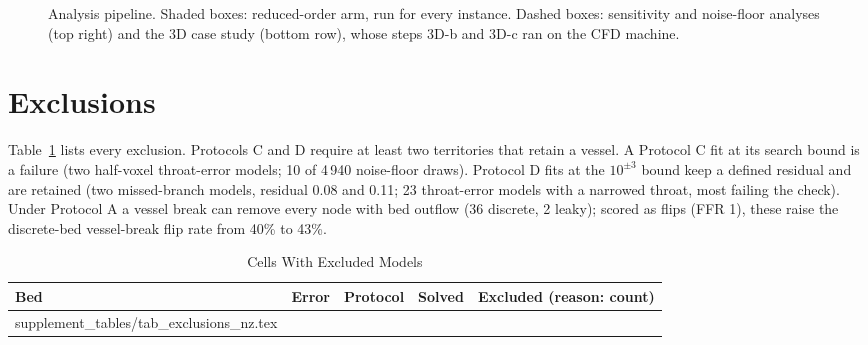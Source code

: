 \documentclass[journal,twoside,web,onecolumn]{ieeecolor}
\begin{document}
\begin{figure}[!h]
\caption{Analysis pipeline. Shaded boxes: reduced-order arm, run for every
instance. Dashed boxes: sensitivity and noise-floor analyses (top right) and the 3D case study (bottom row), whose
steps 3D-b and 3D-c ran on the CFD machine.}\label{fig:pipeline}
\end{figure}

\FloatBarrier
{}
\section{Exclusions}
Table~\ref{tab:excl} lists every exclusion. Protocols C and D require at least two territories that retain a
vessel. A Protocol C fit at its search bound is a failure (two half-voxel throat-error models; 10 of 4\,940
noise-floor draws). Protocol D fits at the $10^{\pm 3}$ bound keep a defined residual and are retained (two
missed-branch models, residual 0.08 and 0.11; 23 throat-error models with a narrowed throat, most failing the check).
Under Protocol A a vessel break can remove every node with bed outflow (36 discrete, 2 leaky); scored as flips (FFR 1),
these raise the discrete-bed vessel-break flip rate from 40\% to 43\%.
\begin{table}[!ht]
\caption{Cells With Excluded Models}\label{tab:excl}
\centering\footnotesize
\begin{tabular}{@{}lllrl@{}}
\toprule
Bed & Error & Protocol & Solved & Excluded (reason: count)\\
\midrule
{} supplement_tables/tab_exclusions_nz.tex 
\bottomrule
\end{tabular}
\end{table}
\end{document}
